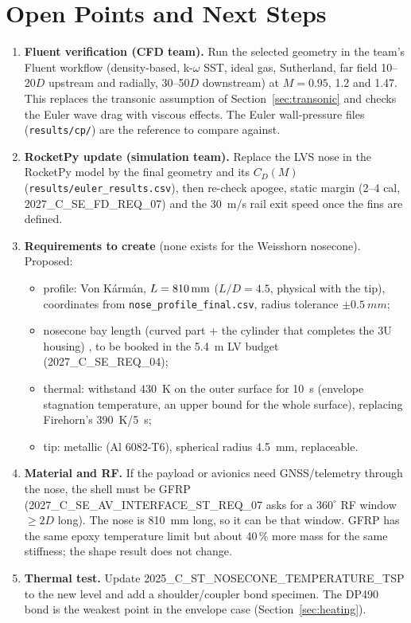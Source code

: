 \section{Open Points and Next Steps}
\label{sec:next}

\begin{enumerate}[leftmargin=*,itemsep=3pt]
\item \textbf{Fluent verification (CFD team).} Run the selected geometry in the team's Fluent
workflow (density-based, k-$\omega$ SST, ideal gas, Sutherland, far field 10--20$D$ upstream and
radially, 30--50$D$ downstream) at $M = 0.95$, 1.2 and 1.47. This replaces the transonic
assumption of Section~\ref{sec:transonic} and checks the Euler wave drag with viscous effects.
The Euler wall-pressure files (\texttt{results/cp/}) are the reference to compare against.
\item \textbf{RocketPy update (simulation team).} Replace the LVS nose in the RocketPy model by
the final geometry and its $C_D(M)$ (\texttt{results/euler\_results.csv}), then re-check apogee,
static margin (2--4 cal, 2027\_C\_SE\_FD\_REQ\_07) and the \SI{30}{m/s} rail exit speed once the
fins are defined.
\item \textbf{Requirements to create} (none exists for the Weisshorn nosecone). Proposed:
\begin{itemize}[itemsep=1pt]
\item profile: Von K\'arm\'an, $L = \SI{810}{mm}{}$ ($L/D=4.5$, \FINLPHYS{} physical with the tip), coordinates from \texttt{nose\_profile\_final.csv}, radius tolerance $\pm\SI{0.5}{mm}$;
\item nosecone bay length (curved part + the cylinder that completes the 3U housing) \FINBAY{}, to be booked in the \SI{5.4}{m} LV budget (2027\_C\_SE\_REQ\_04);
\item thermal: withstand \SI{430}{K} on the outer surface for \SI{10}{s} (envelope stagnation temperature, an upper bound for the whole surface), replacing Firehorn's \SI{390}{K}/\SI{5}{s};
\item tip: metallic (Al 6082-T6), spherical radius \SI{4.5}{mm}, replaceable.
\end{itemize}
\item \textbf{Material and RF.} If the payload or avionics need GNSS/telemetry through the nose,
the shell must be GFRP (2027\_C\_SE\_AV\_INTERFACE\_ST\_REQ\_07 asks for a $360^\circ$ RF window
$\geq 2D$ long). The nose is \SI{810}{mm} long, so it can be that window. GFRP has the same epoxy
temperature limit but about 40\,\% more mass for the same stiffness; the shape result does not
change.
\item \textbf{Thermal test.} Update 2025\_C\_ST\_NOSECONE\_TEMPERATURE\_TSP to the new level and add a
shoulder/coupler bond specimen. The DP490 bond is the weakest point in the envelope case
(Section~\ref{sec:heating}).
\end{enumerate}
